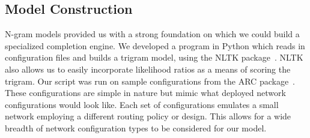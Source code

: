 \subsection{Model Construction}

N-gram models provided us with a strong foundation on which we could build a specialized completion engine. We developed a program in Python which reads in configuration files and builds a trigram model, using the NLTK package~\cite{nltk}. NLTK also allows us to easily incorporate likelihood ratios as a means of scoring the trigram. Our script was run on sample configurations from the ARC package~\cite{arc}. These configurations are simple in nature but mimic what deployed network configurations would look like. Each set of configurations emulates a small network employing a different routing policy or design. This allows for a wide breadth of network configuration types to be considered for our model.\\ 



